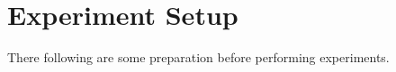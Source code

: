 

\section{Experiment Setup}
There following are some preparation before performing experiments. 
\label{sec:experiment_set_up}
